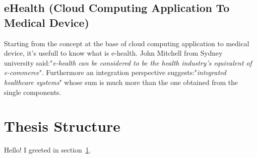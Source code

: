 \subsection{eHealth (Cloud Computing Application To Medical Device)}
Starting from the concept at the base of cloud computing application to medical device, it's usefull to know what is e-health.
John Mitchell from Sydney university said:"\textit{e-health can be considered to be
the health industry's equivalent of e-commerce}". Furthermore an integration perspective suggests:"\textit{integrated healthcare systems}" whose sum is much more than the one obtained from the single components.
\cite{DellaMea}

\section{Thesis Structure}
\label{sec:greetings}

Hello!
I greeted in section~\ref{sec:greetings}.
